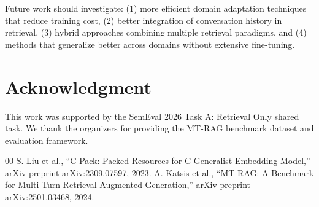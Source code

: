 \documentclass[conference]{IEEEtran}
\begin{document}
Future work should investigate: (1) more efficient domain adaptation techniques that reduce training cost, (2) better integration of conversation history in retrieval, (3) hybrid approaches combining multiple retrieval paradigms, and (4) methods that generalize better across domains without extensive fine-tuning.

\section*{Acknowledgment}
This work was supported by the SemEval 2026 Task A: Retrieval Only shared task. We thank the organizers for providing the MT-RAG benchmark dataset and evaluation framework.

\begin{thebibliography}{00}
 S. Liu et al., ``C-Pack: Packed Resources for C Generalist Embedding Model,'' arXiv preprint arXiv:2309.07597, 2023.
 A. Katsis et al., ``MT-RAG: A Benchmark for Multi-Turn Retrieval-Augmented Generation,'' arXiv preprint arXiv:2501.03468, 2024.
\end{thebibliography}
\end{document}
